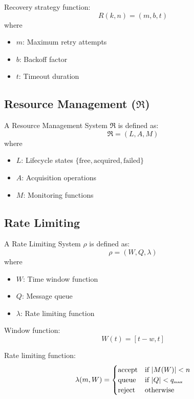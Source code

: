 \documentclass[10pt]{article}
\begin{document}
Recovery strategy function:
$$R(k, n) = (m, b, t)$$
where
\begin{itemize}[leftmargin=2em]
\item $m$: Maximum retry attempts
\item $b$: Backoff factor
\item $t$: Timeout duration
\end{itemize}

\subsection{Resource Management ($\mathfrak{R}$)}

A Resource Management System $\mathfrak{R}$ is defined as:
$$\mathfrak{R} = (L, A, M)$$
where
\begin{itemize}[leftmargin=2em]
\item $L$: Lifecycle states $\{\text{free}, \text{acquired}, \text{failed}\}$
\item $A$: Acquisition operations
\item $M$: Monitoring functions
\end{itemize}

\subsection{Rate Limiting}

A Rate Limiting System $\rho$ is defined as:
$$\rho = (W, Q, \lambda)$$
where
\begin{itemize}[leftmargin=2em]
\item $W$: Time window function
\item $Q$: Message queue
\item $\lambda$: Rate limiting function
\end{itemize}

Window function:
$$W(t) = [t - w, t]$$

Rate limiting function:
$$
\lambda(m, W) = \begin{cases}
\text{accept} & \text{if } |M(W)| < n \\
\text{queue} & \text{if } |Q| < q_{\text{\tiny max}} \\
\text{reject} & \text{otherwise}
\end{cases}
$$

\end{document}
